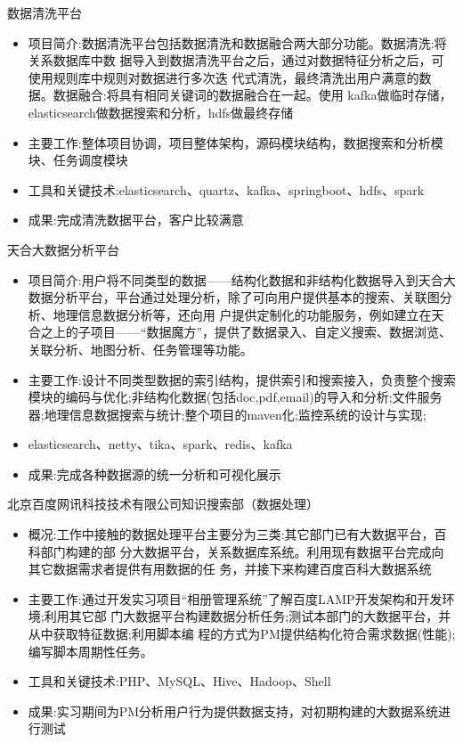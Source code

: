 \documentclass{resume}
\begin{document}
\begin{onehalfspacing}
数据清洗平台
\begin{itemize}
  \item 项目简介:数据清洗平台包括数据清洗和数据融合两大部分功能。数据清洗:将关系数据库中数 据导入到数据清洗平台之后，通过对数据特征分析之后，可使用规则库中规则对数据进行多次迭 代式清洗，最终清洗出用户满意的数据。数据融合:将具有相同关键词的数据融合在一起。使用 kafka做临时存储，elasticsearch做数据搜索和分析，hdfs做最终存储
  \item 主要工作:整体项目协调，项目整体架构，源码模块结构，数据搜索和分析模块、任务调度模块
  \item 工具和关键技术:elasticsearch、quartz、kafka、springboot、hdfs、spark
  \item 成果:完成清洗数据平台，客户比较满意
\end{itemize}
\end{onehalfspacing}
\begin{onehalfspacing}
天合大数据分析平台
\begin{itemize}
  \item 项目简介:用户将不同类型的数据——结构化数据和非结构化数据导入到天合大数据分析平台，平台通过处理分析，除了可向用户提供基本的搜索、关联图分析、地理信息数据分析等，还向用 户提供定制化的功能服务，例如建立在天合之上的子项目——“数据魔方”，提供了数据录入、自定义搜索、数据浏览、关联分析、地图分析、任务管理等功能。
  \item 主要工作:设计不同类型数据的索引结构，提供索引和搜索接入，负责整个搜索模块的编码与优化;非结构化数据(包括doc,pdf,email)的导入和分析;文件服务器;地理信息数据搜索与统计;整个项目的maven化;监控系统的设计与实现;
  \item elasticsearch、netty、tika、spark、redis、kafka
  \item 成果:完成各种数据源的统一分析和可视化展示
\end{itemize}
\end{onehalfspacing}

\begin{onehalfspacing}
北京百度网讯科技技术有限公司知识搜索部（数据处理）
\begin{itemize}
  \item 概况:工作中接触的数据处理平台主要分为三类:其它部门已有大数据平台，百科部门构建的部 分大数据平台，关系数据库系统。利用现有数据平台完成向其它数据需求者提供有用数据的任 务，并接下来构建百度百科大数据系统
  \item 主要工作:通过开发实习项目“相册管理系统”了解百度LAMP开发架构和开发环境;利用其它部 门大数据平台构建数据分析任务;测试本部门的大数据平台，并从中获取特征数据;利用脚本编 程的方式为PM提供结构化符合需求数据(性能);编写脚本周期性任务。
  \item 工具和关键技术:PHP、MySQL、Hive、Hadoop、Shell
  \item 成果:实习期间为PM分析用户行为提供数据支持，对初期构建的大数据系统进行测试
\end{itemize}
\end{onehalfspacing}
\end{document}
